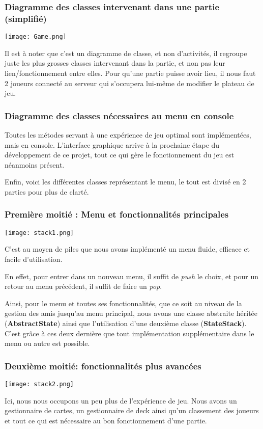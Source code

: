 \documentclass[12pt]{article}
\begin{document}
		\subsubsection{Diagramme des classes intervenant dans une partie (simplifié)}
		\begin{center}\texttt{[image: Game.png]}\end{center}
			Il est à noter que c'est un diagramme de classe, et non d'activités, il regroupe juste les plus grosses classes intervenant dans la partie,
			et non pas leur lien/fonctionnement entre elles.
			Pour qu'une partie puisse avoir lieu, il nous faut 2 joueurs connecté au serveur qui s'occupera lui-même de modifier le plateau de jeu.


		\subsubsection{Diagramme des classes nécessaires au menu en console}
			Toutes les métodes servant à une expérience de jeu optimal sont implémentées, mais en console.
			L'interface graphique arrive à la prochaine étape du développement de ce projet, tout ce qui gère le fonctionnement du jeu est néanmoins présent.

			Enfin, voici les différentes classes représentant le menu, le tout est divisé en 2 parties pour plus de clarté.

			\subsubsection{Première moitié : Menu et fonctionnalités principales}
			\begin{center}\texttt{[image: stack1.png]}\end{center}
				C'est au moyen de piles que nous avons implémenté un menu fluide, efficace et facile d'utilisation.

				En effet, pour entrer dans un nouveau menu, il suffit de \textit{\gls{push}} le choix, et pour un retour au menu précédent, il suffit de faire un \textit{\gls{pop}}. 

				Ainsi, pour le menu et toutes ses fonctionnalités, que ce soit au niveau de la gestion des amis jusqu'au menu principal, 
				nous avons une classe abstraite héritée (\textbf{AbstractState}) ainsi que l'utilisation d'une deuxième classe (\textbf{StateStack}). C'est grâce à ces deux dernière que tout 
				implémentation supplémentaire dans le menu ou autre est possible.


			\subsubsection{Deuxième moitié: fonctionnalités plus avancées}
			\begin{center}\texttt{[image: stack2.png]}\end{center}
				Ici, nous nous occupons un peu plus de l'expérience de jeu. Nous avons un gestionnaire de cartes, un gestionnaire de \gls{deck} ainsi qu'un classement des joueurs et tout ce qui est nécessaire au bon fonctionnement d'une partie.
\end{document}
